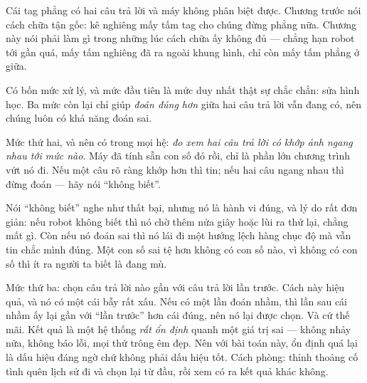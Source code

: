 \documentclass[../../marker.tex]{subfiles}
\begin{document}
\begin{traloi}
\end{traloi}

\begin{dongian}
Cái tag phẳng có hai câu trả lời và máy không phân biệt được. Chương trước nói cách chữa tận gốc: kê nghiêng mấy tấm tag cho chúng đừng phẳng nữa. Chương này nói phải làm gì trong những lúc cách chữa ấy không đủ --- chẳng hạn robot tới gần quá, mấy tấm nghiêng đã ra ngoài khung hình, chỉ còn mấy tấm phẳng ở giữa.

Có bốn mức xử lý, và mức đầu tiên là mức duy nhất thật sự chắc chắn: sửa hình học. Ba mức còn lại chỉ giúp \emph{đoán đúng hơn} giữa hai câu trả lời vẫn đang có, nên chúng luôn có khả năng đoán sai.

Mức thứ hai, và nên có trong mọi hệ: \emph{đo xem hai câu trả lời có khớp ảnh ngang nhau tới mức nào}. Máy đã tính sẵn con số đó rồi, chỉ là phần lớn chương trình vứt nó đi. Nếu một câu rõ ràng khớp hơn thì tin; nếu hai câu ngang nhau thì đừng đoán --- hãy nói ``không biết''.

Nói ``không biết'' nghe như thất bại, nhưng nó là hành vi đúng, và lý do rất đơn giản: nếu robot không biết thì nó chờ thêm nửa giây hoặc lùi ra thử lại, chẳng mất gì. Còn nếu nó đoán sai thì nó lái đi một hướng lệch hàng chục độ mà vẫn tin chắc mình đúng. Một con số sai tệ hơn không có con số nào, vì không có con số thì ít ra người ta biết là đang mù.

Mức thứ ba: chọn câu trả lời nào gần với câu trả lời lần trước. Cách này hiệu quả, và nó có một cái bẫy rất xấu. Nếu có một lần đoán nhầm, thì lần sau cái nhầm ấy lại gần với ``lần trước'' hơn cái đúng, nên nó lại được chọn. Và cứ thế mãi. Kết quả là một hệ thống \emph{rất ổn định} quanh một giá trị sai --- không nhảy nữa, không báo lỗi, mọi thứ trông êm đẹp. Nên với bài toán này, ổn định quá lại là dấu hiệu đáng ngờ chứ không phải dấu hiệu tốt. Cách phòng: thỉnh thoảng cố tình quên lịch sử đi và chọn lại từ đầu, rồi xem có ra kết quả khác không.


\end{dongian}
\end{document}
